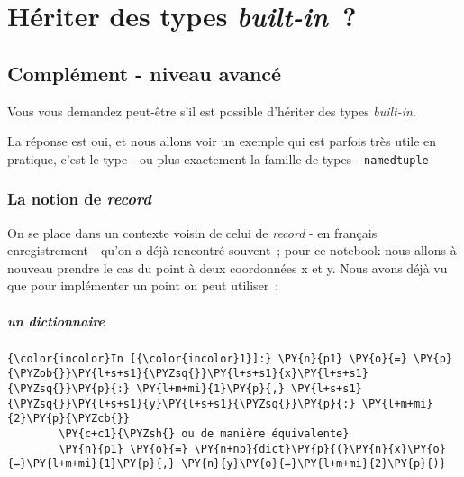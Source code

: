     
    
    
    

    

    \hypertarget{huxe9riter-des-types-built-in}{%
\section{\texorpdfstring{Hériter des types
\emph{built-in}~?}{Hériter des types built-in~?}}\label{huxe9riter-des-types-built-in}}

    \hypertarget{compluxe9ment---niveau-avancuxe9}{%
\subsection{Complément - niveau
avancé}\label{compluxe9ment---niveau-avancuxe9}}

    Vous vous demandez peut-être s'il est possible d'hériter des types
\emph{built-in}.

    La réponse est oui, et nous allons voir un exemple qui est parfois très
utile en pratique, c'est le type - ou plus exactement la famille de
types - \texttt{namedtuple}

    \hypertarget{la-notion-de-record}{%
\subsubsection{\texorpdfstring{La notion de
\emph{record}}{La notion de record}}\label{la-notion-de-record}}

    On se place dans un contexte voisin de celui de \emph{record} - en
français enregistrement - qu'on a déjà rencontré souvent~; pour ce
notebook nous allons à nouveau prendre le cas du point à deux
coordonnées x et y. Nous avons déjà vu que pour implémenter un point on
peut utiliser~:

    \hypertarget{un-dictionnaire}{%
\subparagraph{un dictionnaire}\label{un-dictionnaire}}

    \begin{Verbatim}[commandchars=\\\{\}]
{\color{incolor}In [{\color{incolor}1}]:} \PY{n}{p1} \PY{o}{=} \PY{p}{\PYZob{}}\PY{l+s+s1}{\PYZsq{}}\PY{l+s+s1}{x}\PY{l+s+s1}{\PYZsq{}}\PY{p}{:} \PY{l+m+mi}{1}\PY{p}{,} \PY{l+s+s1}{\PYZsq{}}\PY{l+s+s1}{y}\PY{l+s+s1}{\PYZsq{}}\PY{p}{:} \PY{l+m+mi}{2}\PY{p}{\PYZcb{}}
        \PY{c+c1}{\PYZsh{} ou de manière équivalente}
        \PY{n}{p1} \PY{o}{=} \PY{n+nb}{dict}\PY{p}{(}\PY{n}{x}\PY{o}{=}\PY{l+m+mi}{1}\PY{p}{,} \PY{n}{y}\PY{o}{=}\PY{l+m+mi}{2}\PY{p}{)}
\end{Verbatim}


